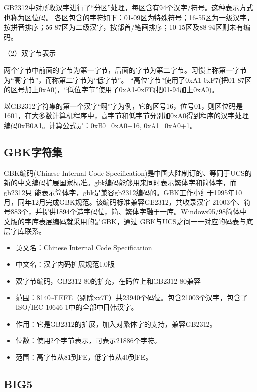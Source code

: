 \documentclass[doctor,openright,twoside]{sjtuthesis}
\providecommand{\tightlist}{%
    \setlength{\itemsep}{0pt}\setlength{\parskip}{0pt}}
\theoremstyle{plain}
\theoremstyle{definition}
\theoremstyle{remark}
\theoremstyle{ocrenumbox}
\theoremstyle{plain}
\newcommand\cqh{“}
\newcommand\cqt{”}
\begin{document}
GB2312中对所收汉字进行了\cqh 分区\cqt 处理，每区含有94个汉字/符号。这种表示方式也称为区位码。
各区包含的字符如下：01-09区为特殊符号；16-55区为一级汉字，按拼音排序；56-87区为二级汉字，按部首/笔画排序；10-15区及88-94区则未有编码。

（2）双字节表示

两个字节中前面的字节为第一字节，后面的字节为第二字节。习惯上称第一字节为\cqh 高字节\cqt  ，而称第二字节为\cqh 低字节\cqt 。
\cqh 高位字节\cqt 使用了0xA1-0xF7(把01-87区的区号加上0xA0)，\cqh 低位字节\cqt 使用了0xA1-0xFE(把01-94加上0xA0)。

以GB2312字符集的第一个汉字\cqh 啊\cqt 字为例，它的区号16，位号01，则区位码是1601，在大多数计算机程序中，高字节和低字节分别加0xA0得到程序的汉字处理编码0xB0A1。计算公式是：0xB0=0xA0+16,
0xA1=0xA0+1。

\hypertarget{gbk}{%
\subsection{GBK字符集}\label{gbk}}

GBK编码(Chinese Internal Code
Specification)是中国大陆制订的、等同于UCS的新的中文编码扩展国家标准。gbk编码能够用来同时表示繁体字和简体字，而gb2312只
能表示简体字，gbk是兼容gb2312编码的。GBK工作小组于1995年10月，同年12月完成GBK规范。该编码标准兼容GB2312，共收录汉字
21003个、符号883个，并提供1894个造字码位，简、繁体字融于一库。Windows95/98简体中文版的字库表层编码就采用的是GBK，通过
GBK与UCS之间一一对应的码表与底层字库联系。

\begin{itemize}
\tightlist
\item
  英文名：Chinese Internal Code Specification
\item
  中文名：汉字内码扩展规范1.0版
\item
  双字节编码，GB2312-80的扩充，在码位上和GB2312-80兼容
\item
  范围：8140\textasciitilde{}FEFE（剔除xx7F）共23940个码位。包含21003个汉字，包含了ISO/IEC
  10646-1中的全部中日韩汉字。
\item
  作用：它是GB2312的扩展，加入对繁体字的支持，兼容GB2312。
\item
  位数：使用2个字节表示，可表示21886个字符。
\item
  范围：高字节从81到FE，低字节从40到FE。
\end{itemize}

\hypertarget{big5}{%
\subsection{BIG5}\label{big5}}
\end{document}
